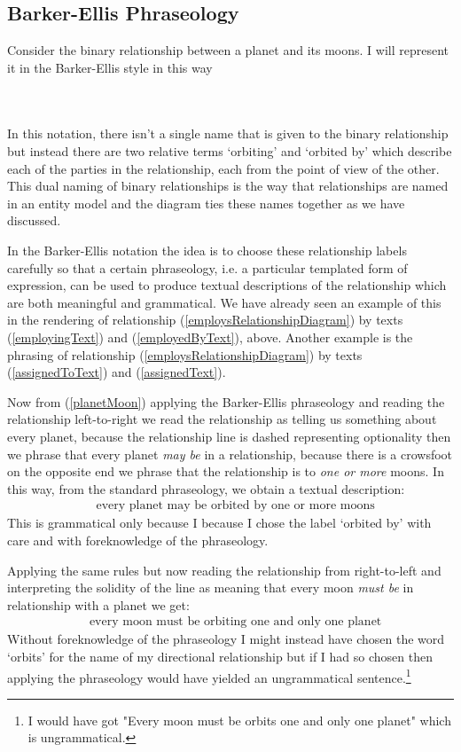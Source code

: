 \subsection{Barker-Ellis Phraseology} 
\mynote 
Consider the binary relationship between a  planet and its moons.
I will represent it in the  Barker-Ellis style in this way
\begin{gather}
\label{planetMoon}
\raisebox{-0.65cm}{

}
\end{gather}
In this notation, there isn't a single name that is given to
 the binary relationship but instead there are two relative terms `orbiting' and `orbited by' which describe each of the parties in the relationship, each from the point of view of the other. This dual naming of binary relationships is the way that relationships are named in an entity model and the diagram ties these names together as we have discussed.

\mynote
In the Barker-Ellis notation the idea 
is to choose these relationship labels
carefully so that a certain phraseology, i.e. a particular templated form of expression,
can be used to produce textual descriptions of the relationship which are both meaningful and grammatical.
We have already seen an example of this in the rendering of
relationship (\ref{employsRelationshipDiagram}) by texts 
(\ref{employingText}) and (\ref{employedByText}), above. 
Another example is the phrasing of relationship (\ref{employsRelationshipDiagram})
by texts (\ref{assignedToText}) and (\ref{assignedText}).  

Now from (\ref{planetMoon}) applying the Barker-Ellis  phraseology and reading the 
relationship left-to-right we read the relationship as telling us something about every planet, because the relationship line is dashed representing optionality then we phrase that every planet \textit{may be} 
in a relationship,
because there is a crowsfoot on the opposite end we phrase that the relationship is to 
\textit{one or more} moons.  In this way, from the standard phraseology, we obtain a textual description:
\begin{align}
&\mbox{every planet may be orbited by one or more moons} 
\end{align}
This is grammatical only because I 
because I chose the label `orbited by' with care and with foreknowledge of the  phraseology.
 
Applying the same rules but now reading  the relationship from right-to-left and interpreting the solidity of the line as 
 meaning that every moon \textit{must be} in relationship with a planet we get:
\begin{align}
&\mbox{every moon must be orbiting  one and only one planet} 
\end{align}
Without foreknowledge of the phraseology I might instead have chosen the word `orbits' for the name of my directional relationship but if I had so chosen then applying the phraseology would have yielded an ungrammatical sentence.\footnote{I would have got "Every moon must be orbits one and only one planet" which is ungrammatical.}
